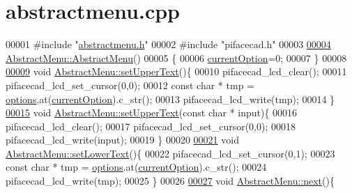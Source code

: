 \hypertarget{abstractmenu_8cpp_source}{}\section{abstractmenu.\+cpp}
\label{abstractmenu_8cpp_source}

\begin{DoxyCode}
00001 \textcolor{preprocessor}{#include "\hyperlink{abstractmenu_8h}{abstractmenu.h}"}
00002 \textcolor{preprocessor}{#include "pifacecad.h"}
00003 
\hypertarget{abstractmenu_8cpp_source.tex_l00004}{}\hyperlink{classAbstractMenu_a45d32cb02984b79e6bc6f6e930ee5c8c}{00004} \hyperlink{classAbstractMenu_a45d32cb02984b79e6bc6f6e930ee5c8c}{AbstractMenu::AbstractMenu}()
00005 \{
00006  \hyperlink{classAbstractMenu_a589fea1bf68c33e0eff64c8b609cb980}{currentOption}=0;
00007 \}
00008 
\hypertarget{abstractmenu_8cpp_source.tex_l00009}{}\hyperlink{classAbstractMenu_a4163c42d2127430e184612cb95211cda}{00009} \textcolor{keywordtype}{void} \hyperlink{classAbstractMenu_a4163c42d2127430e184612cb95211cda}{AbstractMenu::setUpperText}()\{
00010     pifacecad\_lcd\_clear();
00011     pifacecad\_lcd\_set\_cursor(0,0);
00012     \textcolor{keyword}{const} \textcolor{keywordtype}{char} * tmp = \hyperlink{classAbstractMenu_a990dc4299fbe86152487fd35d46a403b}{options}.at(\hyperlink{classAbstractMenu_a589fea1bf68c33e0eff64c8b609cb980}{currentOption}).c\_str();
00013     pifacecad\_lcd\_write(tmp);
00014 \}
\hypertarget{abstractmenu_8cpp_source.tex_l00015}{}\hyperlink{classAbstractMenu_ab07feae31d2527f2830188fc10bcb728}{00015} \textcolor{keywordtype}{void} \hyperlink{classAbstractMenu_a4163c42d2127430e184612cb95211cda}{AbstractMenu::setUpperText}(\textcolor{keyword}{const} \textcolor{keywordtype}{char} * input)\{
00016     pifacecad\_lcd\_clear();
00017     pifacecad\_lcd\_set\_cursor(0,0);
00018     pifacecad\_lcd\_write(input);
00019 \}
00020 
\hypertarget{abstractmenu_8cpp_source.tex_l00021}{}\hyperlink{classAbstractMenu_a5fd1c385e4acd825631ede5bb0424a5c}{00021} \textcolor{keywordtype}{void} \hyperlink{classAbstractMenu_a5fd1c385e4acd825631ede5bb0424a5c}{AbstractMenu::setLowerText}()\{
00022     pifacecad\_lcd\_set\_cursor(0,1);
00023     \textcolor{keyword}{const} \textcolor{keywordtype}{char} * tmp = \hyperlink{classAbstractMenu_a990dc4299fbe86152487fd35d46a403b}{options}.at(\hyperlink{classAbstractMenu_a589fea1bf68c33e0eff64c8b609cb980}{currentOption}).c\_str();
00024     pifacecad\_lcd\_write(tmp);
00025 \}
00026 
\hypertarget{abstractmenu_8cpp_source.tex_l00027}{}\hyperlink{classAbstractMenu_afc9ee4bf101f2761b4e8e083ef3c4a9b}{00027} \textcolor{keywordtype}{void} \hyperlink{classAbstractMenu_afc9ee4bf101f2761b4e8e083ef3c4a9b}{AbstractMenu::next}()\{

\end{DoxyCode}
